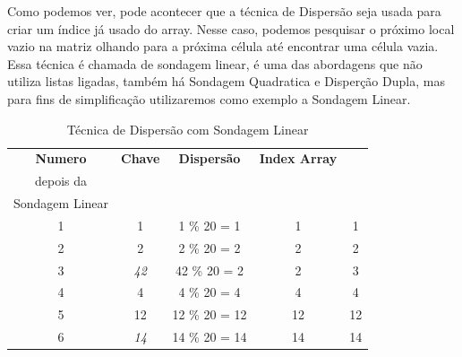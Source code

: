 \documentclass[a4paper, 12pt]{article}
\begin{document}
Como podemos ver, pode acontecer que a técnica de Dispersão seja usada para criar um índice já usado do array. Nesse caso, podemos pesquisar o próximo local vazio na matriz olhando para a próxima célula até encontrar uma célula vazia. Essa técnica é chamada de sondagem linear, é uma das abordagens que não utiliza listas ligadas, também há Sondagem Quadratica e Disperção Dupla, mas para fins de simplificação utilizaremos como exemplo a Sondagem Linear.
\begin{center}
\begin{longtable}[c]{@{}ccccc@{}}
	\caption{Técnica de Dispersão com Sondagem Linear}
	\label{tab:rash-table-2}\\
	\toprule	
	\textbf{Numero}           & \textbf{Chave}            & \textbf{Dispersão}                      & \textbf{ Index Array}    
	& \textbf{\begin{tabular}[c]{@{}c@{}}Index Array \\depois da \\Sondagem Linear \end{tabular}} \\* \midrule
	\endfirsthead
	\endhead
	\multicolumn{1}{|c|}{1} & \multicolumn{1}{c|}{1}  & \multicolumn{1}{c|}{1 \% 20 = 1}   & \multicolumn{1}{c|}{1}  & \multicolumn{1}{c|}{1}                           \\* \midrule
	\multicolumn{1}{|c|}{2} & \multicolumn{1}{c|}{2}  & \multicolumn{1}{c|}{2 \% 20 = 2}   & \multicolumn{1}{c|}{2}  & \multicolumn{1}{c|}{2}                           \\* \midrule
	\multicolumn{1}{|c|}{3} & \multicolumn{1}{c|}{\textit{42}} & \multicolumn{1}{c|}{42 \% 20 = 2}  & \multicolumn{1}{c|}{2}  & \multicolumn{1}{c|}{3}  \\* \midrule
	\multicolumn{1}{|c|}{4} & \multicolumn{1}{c|}{4}  & \multicolumn{1}{c|}{4 \% 20 = 4}   & \multicolumn{1}{c|}{4}  & \multicolumn{1}{c|}{4}                           \\* \midrule
	\multicolumn{1}{|c|}{5} & \multicolumn{1}{c|}{12} & \multicolumn{1}{c|}{12 \% 20 = 12} & \multicolumn{1}{c|}{12} & \multicolumn{1}{c|}{12}                          \\* \midrule
	\multicolumn{1}{|c|}{6} & \multicolumn{1}{c|}{\textit{14}} & \multicolumn{1}{c|}{14 \% 20 = 14} & \multicolumn{1}{c|}{14} & \multicolumn{1}{c|}{14} \\* \midrule

\end{longtable}
\end{center}
\end{document}
